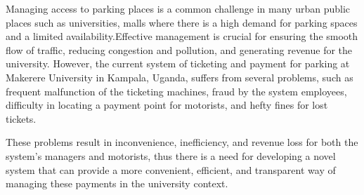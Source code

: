 Managing access to parking places is a common challenge in many urban public places such as universities, malls where there is a high demand for parking spaces and a limited availability\cite{parmar_study_2020}.Effective management is crucial for ensuring the smooth flow of traffic, reducing congestion and pollution, and generating revenue for the university.
However, the current system of ticketing and payment for parking at Makerere University in Kampala, Uganda, suffers from several problems, such as frequent malfunction of the ticketing machines, fraud by the system employees, difficulty in locating a payment point for motorists, and hefty fines for lost tickets.

These problems result in inconvenience, inefficiency, and revenue loss for both the system’s managers and motorists, thus there is a need for developing a novel system that can provide a more convenient, efficient, and transparent way of managing these payments in the university context.


